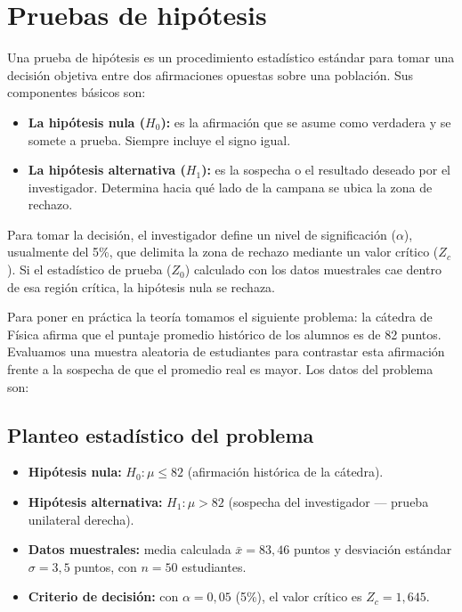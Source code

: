 \section{Pruebas de hipótesis}
Una prueba de hipótesis es un procedimiento estadístico estándar para tomar una decisión
objetiva entre dos afirmaciones opuestas sobre una población. Sus componentes básicos son:
\begin{itemize}
  \item \textbf{La hipótesis nula ($H_0$):} es la afirmación que se asume como verdadera y se    somete a prueba. Siempre incluye el signo igual.
  \item \textbf{La hipótesis alternativa ($H_1$):} es la sospecha o el resultado deseado por el    investigador. Determina hacia qué lado de la campana se ubica la zona de rechazo.
\end{itemize}
Para tomar la decisión, el investigador define un nivel de significación ($\alpha$), usualmente
del 5\%, que delimita la zona de rechazo mediante un valor crítico ($Z_c$). Si el estadístico
de prueba ($Z_0$) calculado con los datos muestrales cae dentro de esa región crítica, la
hipótesis nula se rechaza.

\AnalisisDescriptivo
Para poner en práctica la teoría tomamos el siguiente problema: la cátedra de Física afirma que
el puntaje promedio histórico de los alumnos es de 82 puntos. Evaluamos una muestra aleatoria
de estudiantes para contrastar esta afirmación frente a la sospecha de que el promedio real es
mayor. Los datos del problema son:



\subsection{Planteo estadístico del problema}
\begin{itemize}
  \item \textbf{Hipótesis nula:} $H_0: \mu \leq 82$ (afirmación histórica de la cátedra).
  \item \textbf{Hipótesis alternativa:} $H_1: \mu > 82$ (sospecha del investigador — prueba
    unilateral derecha).
  \item \textbf{Datos muestrales:} media calculada $\bar{x} = 83{,}46$ puntos y desviación
    estándar $\sigma = 3{,}5$ puntos, con $n = 50$ estudiantes.
  \item \textbf{Criterio de decisión:} con $\alpha = 0{,}05$ (5\%), el valor crítico es
    $Z_c = 1{,}645$.
\end{itemize}

